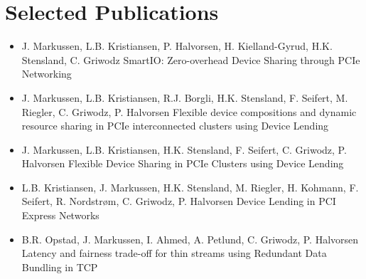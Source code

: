 \section{Selected Publications}
\begin{itemize}
    \item {}
		{J. Markussen, L.B. Kristiansen, P. Halvorsen, H. Kielland-Gyrud, H.K. Stensland, C. Griwodz}
		{SmartIO: Zero-overhead Device Sharing through PCIe Networking}

    \item {}
		{J. Markussen, L.B. Kristiansen, R.J. Borgli, H.K. Stensland, F. Seifert, M. Riegler, C. Griwodz, P. Halvorsen}
		{Flexible device compositions and dynamic resource sharing in PCIe interconnected clusters using Device Lending}
	
	\item {}
		{J. Markussen, L.B. Kristiansen, H.K. Stensland, F. Seifert, C. Griwodz, P. Halvorsen}
		{Flexible Device Sharing in PCIe Clusters using Device Lending}

    \item {}
		{L.B. Kristiansen, J. Markussen, H.K. Stensland, M. Riegler, H. Kohmann, F. Seifert, R. Nordstr{\o}m, C. Griwodz, P. Halvorsen}
		{Device Lending in PCI Express Networks}

    \item {}
		{B.R. Opstad, J. Markussen, I. Ahmed, A. Petlund, C. Griwodz, P. Halvorsen}
		{Latency and fairness trade-off for thin streams using Redundant Data Bundling in TCP}
\end{itemize}
